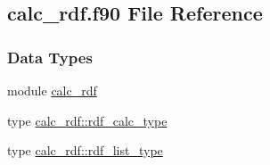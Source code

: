 \hypertarget{calc__rdf_8f90}{\subsection{calc\-\_\-rdf.\-f90 File Reference}
\label{calc__rdf_8f90}
}
\subsubsection*{Data Types}
\begin{DoxyCompactItemize}
\item 
module \hyperlink{classcalc__rdf}{calc\-\_\-rdf}
\item 
type \hyperlink{structcalc__rdf_1_1rdf__calc__type}{calc\-\_\-rdf\-::rdf\-\_\-calc\-\_\-type}
\item 
type \hyperlink{structcalc__rdf_1_1rdf__list__type}{calc\-\_\-rdf\-::rdf\-\_\-list\-\_\-type}
\end{DoxyCompactItemize}
